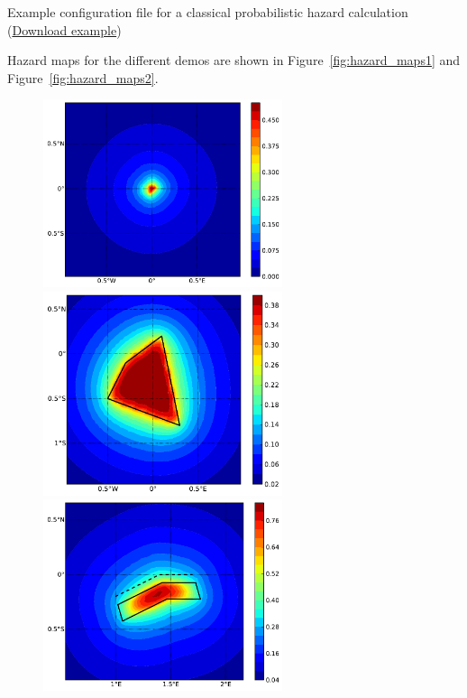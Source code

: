\begin{listing}[htbp]
  \inputminted[firstline=1,firstnumber=1,fontsize=\footnotesize,frame=single,linenos,bgcolor=lightgray,label=job.ini]{ini}{oqum/hazard/verbatim/config_classical.ini}
  \caption{Example configuration file for a classical probabilistic hazard calculation (\href{https://raw.githubusercontent.com/gem/oq-engine/master/doc/manual/oqum/hazard/verbatim/config_classical.ini}{Download example})}
  \label{lst:config_classical}
\end{listing}

Hazard maps for the different demos are shown in Figure~\ref{fig:hazard_maps1} and Figure~\ref{fig:hazard_maps2}.

\begin{figure}
\centering
\subcaptionbox{}
{\includegraphics[width=7cm]{figures/hazard/point.pdf}}
\subcaptionbox{}
{\includegraphics[width=7cm]{figures/hazard/area.pdf}} 
\subcaptionbox{}
{\includegraphics[width=7cm]{figures/hazard/simple_fault.pdf}} 

\end{figure}
